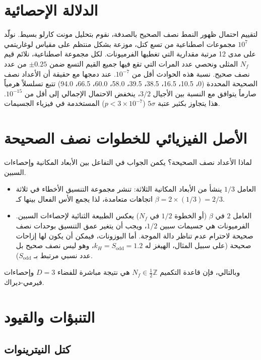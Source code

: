 \documentclass[12pt,a4paper]{article}
\newcommand{\Sodd}{S_{\mathrm{odd}}}
\begin{document}
	\section{الدلالة الإحصائية}
	
	لتقييم احتمال ظهور النمط نصف الصحيح بالصدفة، نقوم بتحليل مونت كارلو بسيط. نولّد \(10^7\) مجموعات اصطناعية من تسع كتل، موزعة بشكل منتظم على مقياس لوغاريتمي على مدى 12 مرتبة مقدارية التي تغطيها الفرميونات. لكل مجموعة اصطناعية، نلائم قيم \(N_f\) المثلى ونحصي عدد المرات التي تقع فيها جميع القيم التسع ضمن \(\pm 0.25\) من عدد نصف صحيح. نسبة هذه الحوادث أقل من \(10^{-7}\). عند دمجها مع حقيقة أن الأعداد نصف الصحيحة المحددة (0، 10.5، 16.5، 38.5، 39.5، 58.0، 60.0، 66.5، 94.0) تتبع تسلسلاً هرمياً صارماً يتوافق مع النسبة بين الأجيال \(3/2\)، ينخفض الاحتمال الإجمالي إلى أقل من \(10^{-15}\). هذا يتجاوز بكثير عتبة \(5\sigma\) (\(p < 3\times 10^{-7}\)) المستخدمة في فيزياء الجسيمات.
	
	\section{الأصل الفيزيائي للخطوات نصف الصحيحة}
	
	لماذا الأعداد نصف الصحيحة؟ يكمن الجواب في التفاعل بين الأبعاد المكانية وإحصاءات السبين.
	
	\begin{itemize}
		\item العامل \(1/3\) ينشأ من الأبعاد المكانية الثلاثة: تنشر مجموعة التنسيق الأخطاء في ثلاثة اتجاهات متعامدة، لذا يجمع الأس الفعال بينها كـ \(\beta = 2 \times (1/3) = 2/3\).
		\item العامل \(2\) في \(\beta\) (أو الخطوة \(1/2\) في \(N_f\)) يعكس الطبيعة الثنائية لإحصاءات السبين. الفرميونات هي جسيمات سبين \(1/2\)، ويجب أن يتغير عمق التنسيق بوحدات نصف صحيحة لاحترام عدم تناظر دالة الموجة. أما البوزونات، فيمكن أن يكون لها إزاحات صحيحة (على سبيل المثال، الهيغز له \(k_H = \Sodd = 1.2\)، وهو ليس نصف صحيح بل عدد نسبي مرتبط بـ \(\Sodd\)).
	\end{itemize}
	
	وبالتالي، فإن قاعدة التكميم \(N_f \in \frac{1}{2}\mathbb{Z}\) هي نتيجة مباشرة للفضاء \(D=3\) وإحصاءات فيرمي-ديراك.
	
	\section{التنبؤات والقيود}
	
	\subsection{كتل النيترينوات}
	
\end{document}
